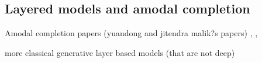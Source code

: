 \subsection{Layered models and amodal completion}




	Amodal completion papers (yuandong and jitendra malik?s papers)
		\cite{amodalKarTCM15}, \cite{categoryShapesKar15}, \cite{zhu2015semantic}
	
	more classical generative layer based models (that are not deep)
	\cite{le2011learning}
	\cite{yang2012layered}
	\cite{kannan2005generative}
	
	
	
	
	
	
	
	
	
	
	
	
	
	
	
